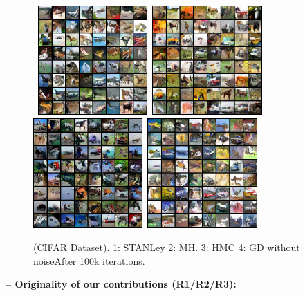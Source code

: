 \documentclass[10pt,twocolumn,letterpaper]{article}
\begin{document}
\begin{figure}
\begin{center}
    \mbox{
        \includegraphics[width=1.65in]{figs/cifaranila}
        \includegraphics[width=1.65in]{figs/mh_x_q_099900}
        }\vspace{0.05in}
            \mbox{
                \includegraphics[width=1.65in]{figs/hmc_x_q_099900}
                        \includegraphics[width=1.65in]{figs/gd_x_q_099900}
        }
\end{center}
\caption{(CIFAR Dataset). 1: STANLey 2: MH. 3: HMC 4: GD without noiseAfter 100k iterations.}
	\label{fig:cifar}
\end{figure}

\noindent \textbf{-- Originality of our contributions (R1/R2/R3):}



% 
% 
\end{document}
